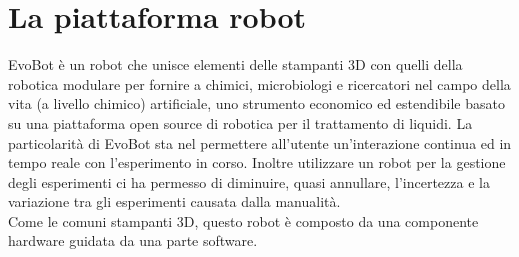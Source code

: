 \chapter{La piattaforma robot}

\label{cha:789}
EvoBot è un robot che unisce elementi delle stampanti 3D con quelli della robotica modulare per fornire a chimici, microbiologi e ricercatori nel campo della vita (a livello chimico) artificiale, uno strumento economico ed estendibile basato su una piattaforma open source di robotica per il trattamento di liquidi. La particolarità di EvoBot sta nel permettere all'utente un'interazione continua ed in tempo reale con l'esperimento in corso.\cite{introd-robot} Inoltre utilizzare un robot per la gestione degli esperimenti ci ha permesso di diminuire, quasi annullare, l'incertezza e la variazione tra gli esperimenti causata dalla manualità. 
\\Come le comuni stampanti 3D,  questo robot è composto da una componente hardware guidata da una parte software. 

